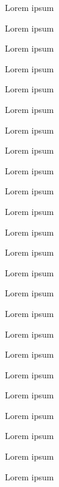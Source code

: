 Lorem ipsum 

Lorem ipsum 

Lorem ipsum 

Lorem ipsum 

Lorem ipsum 

Lorem ipsum 

Lorem ipsum 

Lorem ipsum 

Lorem ipsum 

Lorem ipsum 

Lorem ipsum 

Lorem ipsum 

Lorem ipsum 

Lorem ipsum 

Lorem ipsum 

Lorem ipsum 

Lorem ipsum 

Lorem ipsum 

Lorem ipsum 

Lorem ipsum 

Lorem ipsum 

Lorem ipsum 

Lorem ipsum 

Lorem ipsum 
